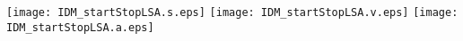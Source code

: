 \documentclass[a4paper,12pt]{article}
\begin{document}

\begin{center}
\texttt{[image: IDM\_startStopLSA.s.eps]} 
\texttt{[image: IDM\_startStopLSA.v.eps]}
\texttt{[image: IDM\_startStopLSA.a.eps]}
\end{center}

\end{document}
